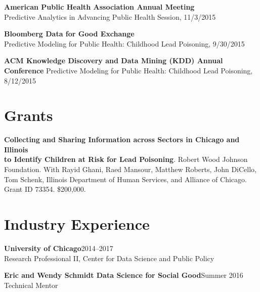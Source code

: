 \documentclass[margin,line]{resume}
\begin{document}
\begin{resume}
	{\bf American Public Health Association Annual Meeting} \\
    Predictive Analytics in Advancing Public Health Session, 11/3/2015 

	{\bf Bloomberg Data for Good Exchange} \\
        Predictive Modeling for Public Health: Childhood Lead Poisoning, 9/30/2015 

    {\bf ACM Knowledge Discovery and Data Mining (KDD) Annual Conference} 
        Predictive Modeling for Public Health: Childhood Lead Poisoning, 8/12/2015

	\section{\mysidestyle Grants}
        {\bf Collecting and Sharing Information across Sectors in Chicago and Illinois\\ to Identify Children at Risk for Lead Poisoning}. Robert Wood Johnson\\ Foundation. With Rayid Ghani, Raed Mansour, Matthew Roberts, John DiCello,\\ Tom Schenk,  Illinois Department of Human Services, and Alliance of Chicago.\\ Grant ID 73354. \$200,000. \\

        \section{\mysidestyle Industry Experience}
	{\bf University of Chicago}\hfill{2014--2017}\\
	Research Professional II, Center for Data Science and Public Policy

        {\bf Eric and Wendy Schmidt Data Science for Social Good}\hfill{Summer 2016}\\
	Technical Mentor


\end{resume}
\end{document}
